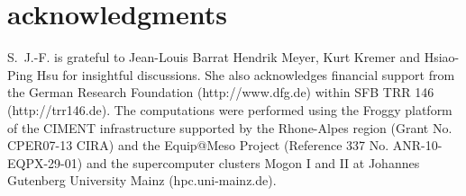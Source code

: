 \documentclass[pre,showpacs,notitlepage,twocolumn]{revtex4-1}
\begin{document}
 
 

 
 
\section*{acknowledgments}
   S.~J.-F.  is grateful to Jean-Louis Barrat  Hendrik Meyer, Kurt Kremer and Hsiao-Ping Hsu for insightful  discussions.
She also acknowledges financial support from the German Research Foundation (http://www.dfg.de) within SFB TRR 146 (http://trr146.de). 
The computations were performed using the Froggy platform of the CIMENT infrastructure supported by the Rhone-Alpes region (Grant No. CPER07-13 CIRA) and the Equip@Meso Project (Reference 337 No. ANR-10-EQPX-29-01) and  the supercomputer clusters Mogon I and II at Johannes Gutenberg University Mainz (hpc.uni-mainz.de).
 
 
 

\iffalse
\clearpage
{\Large \bf GRAPHICAL ABSTRACT}
%
 

 
 
 
\vspace*{0.1in}   %
\begin{center}
\texttt{[image: abstractfig.png]}
\end{center}
 \vspace{0.3in}
{\Large
\begin{minipage}[t]{3in}
\baselineskip = 0.5\baselineskip
 We study the structural and dynamical features of crystallizable polymer melts of the coarse-grained Polyvinyl alcohol model.
The main distinctive feature of this bead-spring model is its triple-well  bending potential that leads to a non-monotonic distribution of bond angles, $P_N(\theta)$, and chain-folding in supercooled melts.
Performing primitive path analysis of entangled polymer melts, we confirm that their primitive paths behave as random walks with a larger step length  and more stretched bonds. 
 \end{minipage}

 }

\fi



 
\end{document}
